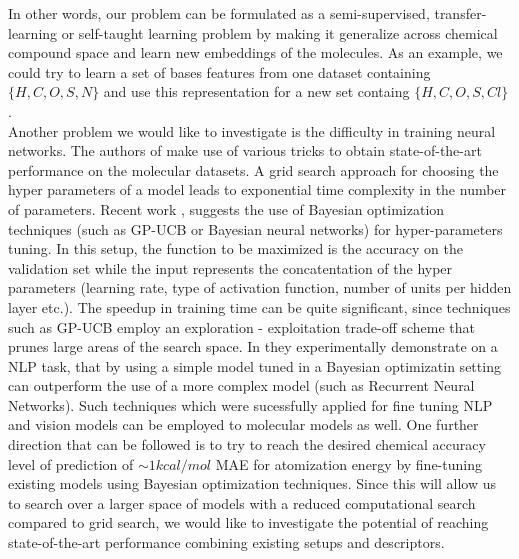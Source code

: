 \documentclass[10pt,journal,a4paper]{IEEEtran}
\begin{document}
%

In other words, our problem can be formulated as a semi-supervised, transfer-learning or self-taught learning problem by making it generalize across chemical compound space and learn new embeddings of the molecules. As an example, we could try to learn a set of bases features from one dataset containing $\{H, C, O, S, N\}$ and use this representation for a new set containg $\{H, C, O, S, Cl\}$.\\[0.05in]



Another problem we would like to investigate is the difficulty in training neural networks. The authors of \cite{montavon2012learning} make use of various tricks \cite{tricks} to obtain state-of-the-art performance on the molecular datasets. A grid search approach for choosing the hyper parameters of a model leads to exponential time complexity in the number of parameters.
Recent work \cite{hyperparameter}, \cite{citeulike} suggests the use of Bayesian optimization techniques (such as GP-UCB or Bayesian neural networks) for hyper-parameters tuning. In this setup, the function to be maximized is the accuracy on the validation set while the input represents the concatentation of the hyper parameters (learning rate, type of activation function, number of units per hidden layer etc.). The speedup in training time can be quite significant, since techniques such as GP-UCB employ an exploration - exploitation trade-off scheme that prunes large areas of the search space.
In \cite{citeulike} they experimentally demonstrate on a NLP task, that by using a simple model tuned in a Bayesian optimizatin setting can outperform the use of a more complex model (such as Recurrent Neural Networks).
Such techniques which were sucessfully applied for fine tuning NLP and vision models can be employed to molecular models as well.
One further direction that can be followed is to try to reach the desired chemical accuracy level of prediction of $\sim 1kcal/mol$ MAE for atomization energy by fine-tuning existing models using Bayesian optimization techniques. 
Since this will allow us to search over a larger space of models with a reduced computational search compared to grid search, we would like to investigate the potential of reaching state-of-the-art performance combining existing setups and descriptors.
\end{document}
